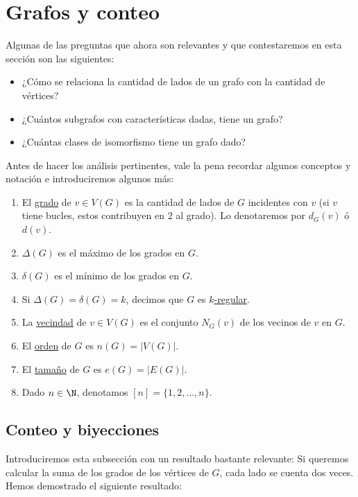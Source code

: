 \section{Grafos y conteo}

Algunas de las preguntas que ahora son relevantes y que contestaremos en esta sección son las siguientes:

\begin{itemize}
    \item ¿Cómo se relaciona la cantidad de lados de un grafo con la cantidad de vértices?
    \item ¿Cuántos subgrafos con características dadas, tiene un grafo?
    \item ¿Cuántas clases de isomorfismo tiene un grafo dado?
\end{itemize}

\begin{defn}
    Antes de hacer los análisis pertinentes, vale la pena recordar algunos conceptos y notación e introduciremos algunos más:
    
    \begin{enumerate}
        \item El \ul{grado} de $v \in V(G)$ es la cantidad de lados de $G$ incidentes con $v$ (si $v$ tiene bucles, estos contribuyen en $2$ al grado). Lo denotaremos por $d_G(v)$ ó $d(v)$.
        \item $\Delta(G)$ es el máximo de los grados en $G$.
        \item $\delta(G)$ es el mínimo de los grados en $G$.
        \item Si $\Delta(G) = \delta(G) = k$, decimos que $G$ es \ul{$k$-regular}.
        \item La \ul{vecindad} de $v \in V(G)$ es el conjunto $N_G(v)$ de los vecinos de $v$ en $G$.
        \item El \ul{orden} de $G$ es $n(G) = |V(G)|$.
        \item El \ul{tamaño} de $G$ es $e(G) = |E(G)|$.
        \item Dado $n \in \N$, denotamos $[n] = \{1, 2, \dots, n\}$.
    \end{enumerate}
\end{defn}

\subsection{Conteo y biyecciones}

Introduciremos esta subsección con un resultado bastante relevante: Si queremos calcular la suma de los grados de los vértices de $G$, cada lado se cuenta dos veces. Hemos demostrado el siguiente resultado:

